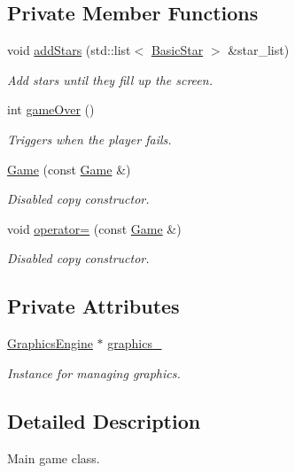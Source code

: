 \subsection*{Private Member Functions}
\begin{DoxyCompactItemize}
\item 
void \hyperlink{classGame_a758c6e31e784bf869133a2274ebc98c7}{add\-Stars} (std\-::list$<$ \hyperlink{classBasicStar}{Basic\-Star} $>$ \&star\-\_\-list)
\begin{DoxyCompactList}\small\item\em Add stars until they fill up the screen. \end{DoxyCompactList}\item 
int \hyperlink{classGame_a98788d98f37433c3a4575c644c0540b9}{game\-Over} ()
\begin{DoxyCompactList}\small\item\em Triggers when the player fails. \end{DoxyCompactList}\item 
\hyperlink{classGame_aa79443880de5f26387c2a1c70c8c1aae}{Game} (const \hyperlink{classGame}{Game} \&)
\begin{DoxyCompactList}\small\item\em Disabled copy constructor. \end{DoxyCompactList}\item 
void \hyperlink{classGame_a33d46168923cdeca0d97553fc47e050e}{operator=} (const \hyperlink{classGame}{Game} \&)
\begin{DoxyCompactList}\small\item\em Disabled copy constructor. \end{DoxyCompactList}\end{DoxyCompactItemize}
\subsection*{Private Attributes}
\begin{DoxyCompactItemize}
\item 
\hyperlink{classGraphicsEngine}{Graphics\-Engine} $\ast$ \hyperlink{classGame_ac96e150f595f287b0e32ff2ad15ef663}{graphics\-\_\-}
\begin{DoxyCompactList}\small\item\em Instance for managing graphics. \end{DoxyCompactList}\end{DoxyCompactItemize}


\subsection{Detailed Description}
Main game class. 

